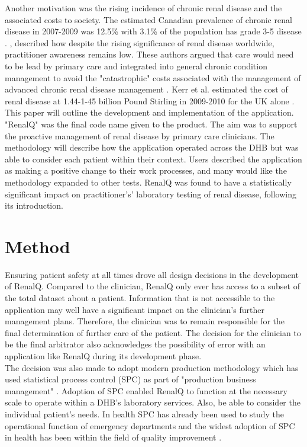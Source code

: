 \documentclass[11pt]{article}
\begin{document}
Another motivation was the rising incidence of chronic renal disease and the associated costs to society. The estimated Canadian prevalence of chronic renal disease in 2007-2009 was 12.5\% with 3.1\% of the population has grade 3-5 disease \citep{arora2013prevalence}. \citep{anachronistic}, described how despite the rising significance of renal disease worldwide, practitioner awareness remains low. These authors argued that care would need to be lead by primary care and integrated into general chronic condition management to avoid the "catastrophic" costs associated with the management of advanced chronic renal disease management \citep{jha2013chronic}. Kerr et al. estimated the cost of renal disease at 1.44-1-45 billion Pound Stirling in 2009-2010 for the UK alone \citep{underestimating}.\\

This paper will outline the development and implementation of the application. "RenalQ" was the final code name given to the product. The aim was to support the proactive management of renal disease by primary care clinicians. The methodology will describe how the application operated across the DHB but was able to consider each patient within their context.  Users described the application as making a positive change to their work processes, and many would like the methodology expanded to other tests. RenalQ was found to have a statistically significant impact on practitioner's' laboratory testing of renal disease, following its introduction.\\

\section{Method}
Ensuring patient safety at all times drove all design decisions in the development of RenalQ. Compared to the clinician, RenalQ only ever has access to a subset of the total dataset about a patient. Information that is not accessible to the application may well have a significant impact on the clinician's further management plans. Therefore, the clinician was to remain responsible for the final determination of further care of the patient.   The decision for the clinician to be the final arbitrator also acknowledges the possibility of error with an application like RenalQ during its development phase. \\

The decision was also made to adopt modern production methodology which has used statistical process control (SPC) as part of "production business management" \citep{rosemann2015six, cheng2015run, epprecht2015statistical}. Adoption of SPC enabled RenalQ to function at the necessary scale to operate within a DHB's laboratory services. Also, be able to consider the individual patient's needs. In health SPC has already been used to study the operational function of emergency departments \citep{pimentel2015statistical} and the widest adoption of SPC in health has been within the field of quality improvement \citep{provost2011health}.\\
\end{document}
